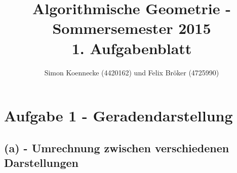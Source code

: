 \documentclass[a4paper]{article}
\begin{document}
\title{Algorithmische Geometrie - Sommersemester 2015\\
       1. Aufgabenblatt }
\author{Simon Koennecke (4420162) und Felix Bröker (4725990)}
\date{}
\maketitle

\section*{Aufgabe 1 - Geradendarstellung}

\subsection*{(a) - Umrechnung zwischen verschiedenen Darstellungen} 
\end{document}
